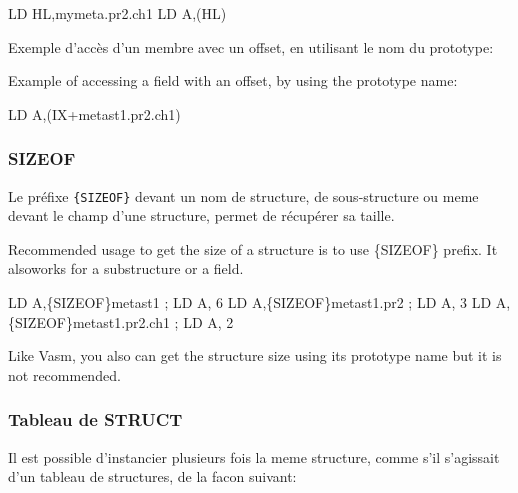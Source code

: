 \begin{code}
LD HL,mymeta.pr2.ch1
LD A,(HL)
\end{code}

\begin{xfr}
Exemple d'accès d'un membre avec un offset, en utilisant le nom du prototype:
\end{xfr}
\begin{xen}
Example of accessing a field with an offset, by using the prototype name:
\end{xen}

\begin{code}
LD A,(IX+metast1.pr2.ch1)
\end{code}

\subsubsection{SIZEOF}

\begin{xfr}
  Le préfixe \texttt{\{SIZEOF\}} devant un nom de structure, de sous-structure ou meme devant le champ d'une structure, permet de récupérer sa taille.
\end{xfr}

\begin{xen}
Recommended usage to get the size of a structure is to use \{SIZEOF\} prefix.
It alsoworks for a substructure or a field.
\end{xen}

\begin{code}
  LD A,\{SIZEOF\}metast1              ; LD A, 6
  LD A,\{SIZEOF\}metast1.pr2          ; LD A, 3
  LD A,\{SIZEOF\}metast1.pr2.ch1      ; LD A, 2
\end{code}

\begin{xen}
Like Vasm, you also can get the structure size using its prototype name but it is not recommended.
\end{xen}


\begin{xfr}
\subsubsection{Tableau de STRUCT}
Il est possible d'instancier plusieurs fois la meme structure, comme s'il s'agissait d'un tableau de structures, de la facon suivant:
\end{xfr}

